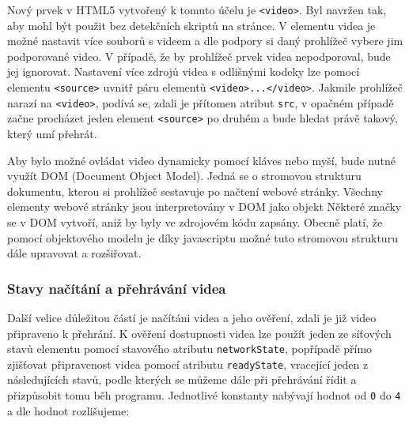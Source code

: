 Nový prvek v HTML5 vytvořený k tomuto účelu je \texttt{<video>}. Byl navržen tak, aby mohl být použit bez detekčních skriptů na stránce. V elementu videa je možné nastavit více souborů s videem a dle podpory si daný prohlížeč vybere jim podporované video. V případě, že by prohlížeč prvek videa nepodporoval, bude jej ignorovat. Nastavení více zdrojů videa s odlišnými kodeky lze pomocí elementu \texttt{<source>} uvnitř páru elementů \texttt{<video>...</video>}. Jakmile prohlížeč narazí na \texttt{<video>}, podívá se, zdali je přítomen atribut \texttt{src}, v opačném případě začne procházet jeden element \texttt{<source>} po druhém a bude hledat právě takový, který umí přehrát.

Aby bylo možné ovládat video dynamicky pomocí kláves nebo myší, bude nutné využít DOM (Document Object Model). Jedná se o stromovou strukturu dokumentu, kterou si prohlížeč sestavuje po načtení webové stránky. Všechny elementy webové stránky jsou interpretovány v DOM jako objekt Některé značky se v DOM vytvoří, aniž by byly ve zdrojovém kódu zapsány. Obecně platí, že pomocí objektového modelu je díky javascriptu možné tuto stromovou strukturu dále upravovat a rozšiřovat. 



\subsubsection{Stavy načítání a přehrávání videa}
Další velice důležitou částí je načítáni videa a jeho ověření, zdali  je již video připraveno k přehrání. K ověření dostupnosti videa lze použít jeden ze síťových stavů elementu pomocí stavového atributu \texttt{networkState}, popřípadě přímo zjišťovat připravenost videa pomocí atributu \texttt{readyState}, vracející jeden z následujících stavů, podle kterých se můžeme dále při přehrávání řídit a přizpůsobit tomu běh programu. Jednotlivé konstanty nabývají hodnot od \texttt{0} do \texttt{4} a dle hodnot rozlišujeme:


